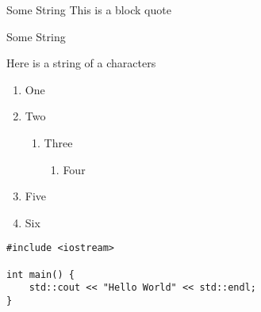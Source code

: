 \documentclass{article}
\begin{document}
\begin{displayquote}
	Some String
	This is a block quote
	\begin{displayquote}
		Some String
	\end{displayquote}
\end{displayquote}
Here is a string of a characters
\begin{enumerate}[label=\arabic*.]
	\item One
	\item Two
	\begin{enumerate}[label=\arabic*.]
		\item Three
		\begin{enumerate}[label=\arabic*.]
			\item Four
		\end{enumerate}
	\end{enumerate}
	\item Five
	\item Six
\end{enumerate}
\begin{lstlisting}
#include <iostream>

int main() {
    std::cout << "Hello World" << std::endl;
}
\end{lstlisting}
\end{document}
